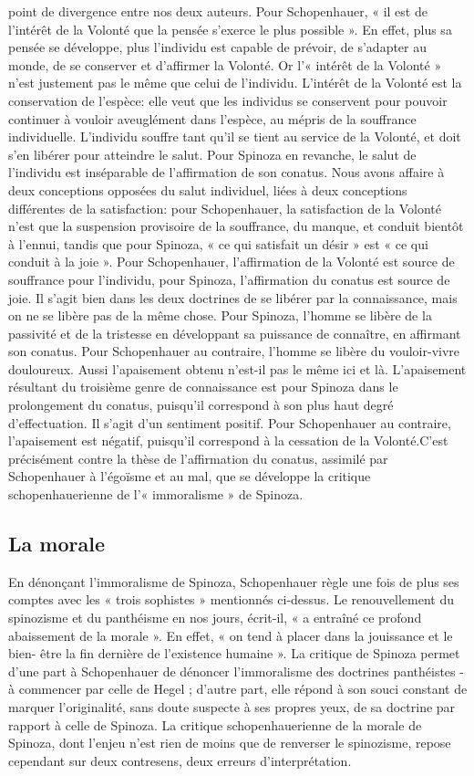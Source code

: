 point de divergence entre nos deux auteurs. Pour Schopenhauer, « il est de l’intérêt de la Volonté que la
pensée s’exerce le plus possible ». En effet, plus sa pensée se
développe, plus l’individu est capable de prévoir, de s’adapter au monde, de se conserver et d’affirmer la
Volonté. Or l’« intérêt de la Volonté » n’est justement pas le même que celui de l’individu. L’intérêt de la
Volonté est la conservation de l’espèce: elle veut que les individus se conservent pour pouvoir continuer à
vouloir aveuglément dans l’espèce, au mépris de la souffrance individuelle. L’individu souffre tant qu’il se
tient au service de la Volonté, et doit s’en libérer pour atteindre le salut. Pour Spinoza en revanche, le salut de
l’individu est inséparable de l’affirmation de son conatus.
Nous avons affaire à deux conceptions opposées du salut individuel, liées à deux conceptions différentes
de la satisfaction: pour Schopenhauer, la satisfaction de la Volonté n’est que la suspension provisoire de la
souffrance, du manque, et conduit bientôt à l’ennui, tandis que pour Spinoza, « ce qui satisfait un désir » est
« ce qui conduit à la joie ». Pour Schopenhauer, l’affirmation de la Volonté est source
de souffrance pour l’individu, pour Spinoza, l’affirmation du conatus est source de joie.
Il s’agit bien dans les deux doctrines de se libérer par la connaissance, mais on ne se libère pas de la même
chose. Pour Spinoza, l’homme se libère de la passivité et de la tristesse en développant sa puissance de
connaître, en affirmant son conatus. Pour Schopenhauer au contraire, l’homme se libère du vouloir-vivre
douloureux. Aussi l’apaisement obtenu n’est-il pas le même ici et là. L’apaisement résultant du troisième
genre de connaissance est pour Spinoza dans le prolongement du conatus, puisqu’il correspond à son plus
haut degré d’effectuation. Il s’agit d’un sentiment positif. Pour Schopenhauer au contraire, l’apaisement est
négatif, puisqu’il correspond à la cessation de la Volonté.C’est précisément contre la thèse de l’affirmation
du conatus, assimilé par Schopenhauer à l’égoïsme et au
mal, que se développe la critique schopenhauerienne de l’« immoralisme » de Spinoza.

\subsection{La morale}

En dénonçant l’immoralisme de Spinoza, Schopenhauer règle une fois de plus ses comptes avec les « trois
sophistes » mentionnés ci-dessus. Le renouvellement du spinozisme et du panthéisme en nos jours, écrit-il,
« a entraîné ce profond abaissement de la morale ». En effet, « on tend à placer dans la jouissance et le bien-
être la fin dernière de l’existence humaine ». La critique de Spinoza permet d’une part à
Schopenhauer de dénoncer l’immoralisme des doctrines panthéistes - à commencer par celle de Hegel ;
d’autre part, elle répond à son souci constant de marquer l’originalité, sans doute suspecte à
ses propres yeux, de sa doctrine par rapport à celle de Spinoza. La critique schopenhauerienne de la morale
de Spinoza, dont l’enjeu n’est rien de moins que de renverser le spinozisme, repose cependant sur deux
contresens, deux erreurs d’interprétation.

